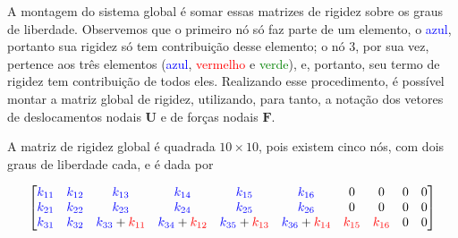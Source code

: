 A montagem do sistema global é somar essas matrizes de rigidez sobre os graus de liberdade. Observemos que o primeiro nó só faz parte de um elemento, o \textcolor{blue}{azul}, portanto sua rigidez só tem contribuição desse elemento; o nó $3$, por sua vez, pertence aos três elementos (\textcolor{blue}{azul}, \textcolor{red}{vermelho} e \textcolor{green}{verde}), e, portanto, seu termo de rigidez tem contribuição de todos eles. Realizando esse procedimento, é possível montar a matriz global de rigidez, utilizando, para tanto, a notação dos vetores de deslocamentos nodais $\bm{U}$ e de forças nodais $\bm{F}$.

A matriz de rigidez global é quadrada $10 \times 10$, pois existem cinco nós, com dois graus de liberdade cada, e é dada por
\begin{landscape}
    \begin{equation}
            \begin{bmatrix}
                \textcolor{blue}{k_{11}} &  \textcolor{blue}{k_{12}} &  \textcolor{blue}{k_{13}}                           &  \textcolor{blue}{k_{14}}                             &  \textcolor{blue}{k_{15}}                                                       &  \textcolor{blue}{k_{16}}                                                       & 0                                                    & 0                                                    & 0                          & 0                          \\
                \textcolor{blue}{k_{21}} &  \textcolor{blue}{k_{22}} &  \textcolor{blue}{k_{23}}                           &  \textcolor{blue}{k_{24}}                             &  \textcolor{blue}{k_{25}}                                                       &  \textcolor{blue}{k_{26}}                                                       & 0                                                    & 0                                                    & 0                          & 0                          \\
                \textcolor{blue}{k_{31}} &  \textcolor{blue}{k_{32}} &  \textcolor{blue}{k_{33}} + \textcolor{red}{k_{11}} &  \textcolor{blue}{k_{34}} + \textcolor{red}{k_{12}}   &  \textcolor{blue}{k_{35}} + \textcolor{red}{k_{13}}                             &  \textcolor{blue}{k_{36}} + \textcolor{red}{k_{14}}                             &  \textcolor{red}{k_{15}}                             &  \textcolor{red}{k_{16}}                             & 0                          & 0                          \\

\end{bmatrix}
\end{equation}
\end{landscape}
